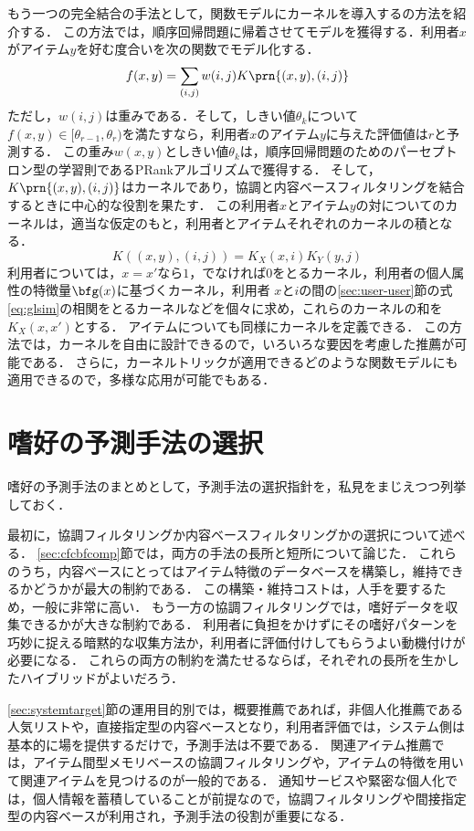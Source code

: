 もう一つの完全結合の手法として，関数モデルにカーネルを導入する\cite{icml:04:06}の方法を紹介する．
この方法では，順序回帰問題に帰着させてモデルを獲得する．利用者$x$がアイテム$y$を好む度合いを次の関数でモデル化する．
\[
f(x,y)=\sum_{(i,j)}w(i,j)K\prn{(x,y),(i,j)}
\]
ただし，$w(i,j)$は重みである．そして，しきい値$\theta_k$について$f(x,y)\in[\theta_{r-1},\theta_r)$を満たすなら，利用者$x$のアイテム$y$に与えた評価値は$r$と予測する．
この重み$w(x,y)$としきい値$\theta_k$は，順序回帰問題のためのパーセプトロン型の学習則であるPRankアルゴリズム\cite{nips:02:01}で獲得する．
そして，$K\prn{(x,y),(i,j)}$はカーネル\cite{jb:036:00}であり，協調と内容ベースフィルタリングを結合するときに中心的な役割を果たす．
この利用者$x$とアイテム$y$の対についてのカーネルは，適当な仮定のもと，利用者とアイテムそれぞれのカーネルの積となる．
\[
 K((x,y),(i,j))=K_X(x,i)K_Y(y,j)
\]
利用者については，$x=x'$なら$1$，でなければ$0$をとるカーネル，利用者の個人属性の特徴量$\bfg(x)$に基づくカーネル，利用者
$x$と$i$の間の\ref{sec:user-user}節の式\eqref{eq:glsim}の相関をとるカーネルなどを個々に求め，これらのカーネルの和を$K_X(x,x')$とする．
アイテムについても同様にカーネルを定義できる．
この方法では，カーネルを自由に設計できるので，いろいろな要因を考慮した推薦が可能である．
さらに，カーネルトリックが適用できるどのような関数モデルにも適用できるので，多様な応用が可能でもある．

\section{嗜好の予測手法の選択}
\label{sec:rsselect}

嗜好の予測手法のまとめとして，予測手法の選択指針を，私見をまじえつつ列挙しておく．

最初に，協調フィルタリングか内容ベースフィルタリングかの選択について述べる．
\ref{sec:cfcbfcomp}節では，両方の手法の長所と短所について論じた．
これらのうち，内容ベースにとってはアイテム特徴のデータベースを構築し，維持できるかどうかが最大の制約である．
この構築・維持コストは，人手を要するため，一般に非常に高い．
もう一方の協調フィルタリングでは，嗜好データを収集できるかが大きな制約である．
利用者に負担をかけずにその嗜好パターンを巧妙に捉える暗黙的な収集方法か，利用者に評価付けしてもらうよい動機付けが必要になる．
これらの両方の制約を満たせるならば，それぞれの長所を生かしたハイブリッドがよいだろう．

\ref{sec:systemtarget}節の運用目的別では，概要推薦であれば，非個人化推薦である人気リストや，直接指定型の内容ベースとなり，利用者評価では，システム側は基本的に場を提供するだけで，予測手法は不要である．
関連アイテム推薦では，アイテム間型メモリベースの協調フィルタリングや，アイテムの特徴を用いて関連アイテムを見つけるのが一般的である．
通知サービスや緊密な個人化では，個人情報を蓄積していることが前提なので，協調フィルタリングや間接指定型の内容ベースが利用され，予測手法の役割が重要になる．

